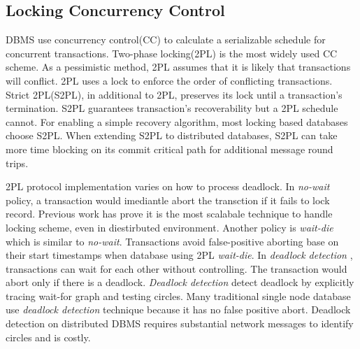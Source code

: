 \documentclass[conference]{IEEEtran}
\begin{document}
\subsection{Locking Concurrency Control}
DBMS use concurrency control(CC) to calculate a serializable schedule for concurrent transactions.
Two-phase locking(2PL) is the most widely used CC scheme.
As a pessimistic method, 2PL assumes that it is likely that transactions will conflict.
2PL uses a lock to enforce the order of conflicting transactions.
Strict 2PL(S2PL), in additional to 2PL, preserves its lock until a transaction's termination.
S2PL guarantees transaction's recoverability but a 2PL schedule cannot.
For enabling a simple recovery algorithm, most locking based databases choose S2PL.
When extending S2PL to distributed databases, S2PL can take more time blocking on its commit critical path for additional message round trips.

2PL protocol implementation varies on how to process deadlock.
In \emph{no-wait}
\cite{EvaluationOfCC:journals/pvldb/HardingAPS17}
policy, a transaction would imediantle abort the transction if it 
 fails to lock record. 
Previous work has prove it is the most scalabale technique to handle locking scheme, even in diestirbuted environment\cite{EvaluationCC1000Cores:journals/pvldb/YuBPDS14}\cite{EvaluationOfCC:journals/pvldb/HardingAPS17}.
Another policy is \emph{wait-die} \cite{LockNoWait:journals/csur/BernsteinG81} which is similar to \emph{no-wait}.
Transactions avoid false-positive aborting base on their start timestamps when database using 2PL \emph{wait-die}.
In \emph{deadlock detection} \cite{LockCC:conf/ds/GrayLPT76},
transactions can wait for each other without controlling.
The transaction would abort only if there is a deadlock.
\emph{Deadlock detection} detect deadlock by explicitly tracing wait-for graph and testing circles.
Many traditional single node database\cite{MySQL}\cite{PostgreSQL} use \emph{deadlock detection} technique because it has no false positive abort. 
Deadlock detection on distributed DBMS requires substantial network messages to identify circles and is costly.
\end{document}
